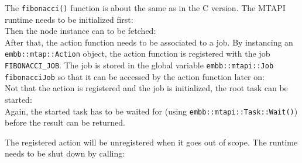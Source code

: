 The \lstinline|fibonacci()| function is about the same as in the C version. The MTAPI runtime needs to be initialized first:
%
\\
%
Then the node instance can to be fetched:
%
\\
%
After that, the action function needs to be associated to a job. By instancing an \lstinline|embb::mtap::Action| object, the action function is registered with the job \lstinline|FIBONACCI_JOB|. The job is stored in the global variable \lstinline|embb::mtapi::Job fibonacciJob| so that it can be accessed by the action function later on:
%
\\
%
Not that the action is registered and the job is initialized, the root task can be started:
%
\\
%
Again, the started task has to be waited for (using \lstinline|embb::mtapi::Task::Wait()|) before the result can be returned.

The registered action will be unregistered when it goes out of scope.
The runtime needs to be shut down by calling:
\\
